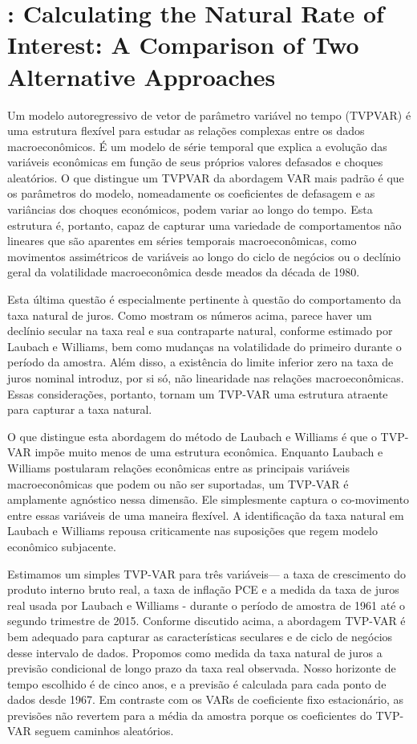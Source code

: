 \section{\citet{Lubik:2015}: Calculating the Natural Rate of Interest: A Comparison of Two Alternative Approaches}

Um modelo autoregressivo de vetor de parâmetro variável no tempo (TVPVAR) é uma estrutura flexível para estudar as relações complexas entre os dados macroeconômicos. É um modelo de série temporal que explica a evolução das variáveis econômicas em função de seus próprios valores defasados e choques aleatórios. O que distingue um TVPVAR da abordagem VAR mais padrão é que os parâmetros do modelo, nomeadamente os coeficientes de defasagem e as variâncias dos choques económicos, podem variar ao longo do tempo. Esta estrutura é, portanto, capaz de capturar uma variedade de comportamentos não lineares que são aparentes em séries temporais macroeconômicas, como movimentos assimétricos de variáveis ao longo do ciclo de negócios ou o declínio geral da volatilidade macroeconômica desde meados da década de 1980.

Esta última questão é especialmente pertinente à questão do comportamento da taxa natural de juros. Como mostram os números acima, parece haver um declínio secular na taxa real e sua contraparte natural, conforme estimado por Laubach e Williams, bem como mudanças na volatilidade do primeiro durante o período da amostra. Além disso, a existência do limite inferior zero na taxa de juros nominal introduz, por si só, não linearidade nas relações macroeconômicas. Essas considerações, portanto, tornam um TVP-VAR uma estrutura atraente para capturar a taxa natural.

O que distingue esta abordagem do método de Laubach e Williams é que o TVP-VAR impõe muito menos de uma estrutura econômica. Enquanto Laubach e Williams postularam relações econômicas entre as principais variáveis macroeconômicas que podem ou não ser suportadas, um TVP-VAR é amplamente agnóstico nessa dimensão. Ele simplesmente captura o co-movimento entre essas variáveis de uma maneira flexível. A identificação da taxa natural em Laubach e Williams repousa criticamente nas suposições que regem
modelo econômico subjacente.

Estimamos um simples TVP-VAR para três variáveis— a taxa de crescimento do produto interno bruto real, a taxa de inflação PCE e a medida da taxa de juros real usada por Laubach e Williams - durante o período de amostra de 1961 até o segundo trimestre de 2015. Conforme discutido acima, a abordagem TVP-VAR é bem adequado para capturar as características seculares e de ciclo de negócios desse intervalo de dados. Propomos como medida da taxa natural de juros a previsão condicional de longo prazo da taxa real observada. Nosso horizonte de tempo escolhido é de cinco anos, e a previsão é calculada para cada ponto de dados desde 1967. Em contraste com os VARs de coeficiente fixo estacionário, as previsões não revertem para a média da amostra porque os coeficientes do TVP-VAR seguem caminhos aleatórios.